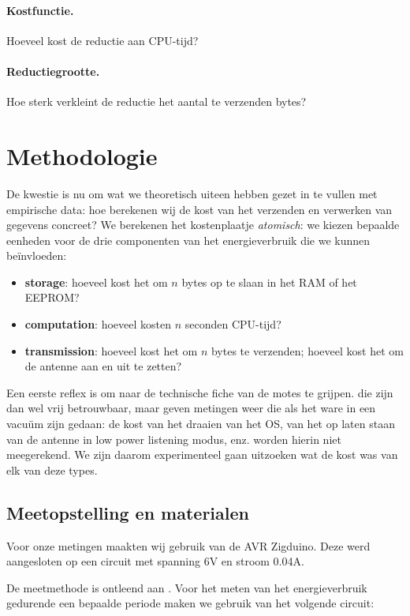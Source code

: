 \documentclass{article}
\begin{document}
\paragraph{Kostfunctie.} Hoeveel kost de reductie aan CPU-tijd?
\paragraph{Reductiegrootte.} Hoe sterk verkleint de reductie het aantal te
verzenden bytes?

\section{Methodologie}

De kwestie is nu om wat we theoretisch uiteen hebben gezet in te vullen met
empirische data: hoe berekenen wij de kost van het verzenden en verwerken van
gegevens concreet? We berekenen het kostenplaatje \textit{atomisch}: we kiezen
bepaalde eenheden voor de drie componenten van het energieverbruik die we kunnen
be\"invloeden:

\begin{itemize}
\item \textbf{storage}: hoeveel kost het om $n$ bytes op te slaan in het RAM of
het EEPROM?
\item \textbf{computation}: hoeveel kosten $n$ seconden CPU-tijd?
\item \textbf{transmission}: hoeveel kost het om $n$ bytes te verzenden; hoeveel
kost het om de antenne aan en uit te zetten?
\end{itemize}

Een eerste reflex is om naar de technische fiche van de motes te grijpen. die
zijn dan wel vrij betrouwbaar, maar geven metingen weer die als het ware in een
vacu\"um zijn gedaan: de kost van het draaien van het OS, van het op laten staan
van de antenne in low power listening modus, enz. worden hierin niet
meegerekend. We zijn daarom experimenteel gaan uitzoeken wat de kost was van elk
van deze types.

\subsection{Meetopstelling en materialen}

Voor onze metingen maakten wij gebruik van de AVR Zigduino. Deze werd
aangesloten op een circuit met spanning 6V en stroom 0.04A.

De meetmethode is ontleend aan \cite{hughes2013energy}. Voor het meten van het
energieverbruik gedurende een bepaalde periode maken we gebruik van het volgende
circuit:
\end{document}
